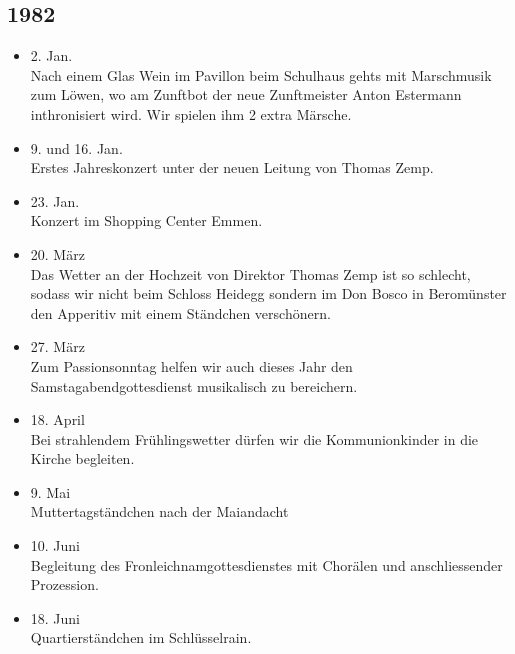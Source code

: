 \subsection{1982}

\begin{history}


    \begin{itemize}

        \item 2. Jan.\\
              Nach einem Glas Wein im Pavillon beim Schulhaus gehts mit Marschmusik
              zum Löwen, wo am Zunftbot der neue Zunftmeister Anton Estermann
              inthronisiert wird. Wir spielen ihm 2 extra Märsche.

        \item 9. und 16. Jan.\\
              Erstes Jahreskonzert unter der neuen Leitung von Thomas Zemp.

        \item 23. Jan.\\
              Konzert im Shopping Center Emmen.

        \item 20. März\\
              Das Wetter an der Hochzeit von Direktor Thomas Zemp ist so schlecht,
              sodass wir nicht beim Schloss Heidegg sondern im Don Bosco in
              Beromünster den Apperitiv mit einem Ständchen verschönern.

        \item 27. März\\
              Zum Passionsonntag helfen wir auch dieses Jahr den
              Samstagabendgottesdienst musikalisch zu bereichern.

        \item 18. April\\
              Bei strahlendem Frühlingswetter dürfen wir die Kommunionkinder in die
              Kirche begleiten.

        \item 9. Mai\\
              Muttertagständchen nach der Maiandacht

        \item 10. Juni\\
              Begleitung des Fronleichnamgottesdienstes mit Chorälen und
              anschliessender Prozession.

        \item 18. Juni\\
              Quartierständchen im Schlüsselrain.


\end{itemize}
\end{history}
